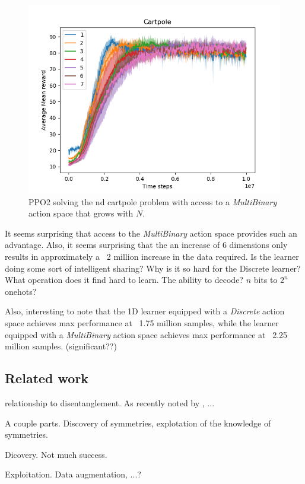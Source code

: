 \begin{figure}
\centering
\includegraphics[width=1\textwidth,height=0.5\textheight]{../../pictures/figures/multibinary-nd-cart.png}
\caption{PPO2 solving the nd cartpole problem with access to a \textit{MultiBinary} action space that grows with $N$.}
\end{figure}

It seems surprising that access to the \textit{MultiBinary} action space provides such an advantage.
Also, it seems surprising that the an increase of 6 dimensions only results in approximately a ~2 million increase in the data required.
Is the learner doing some sort of intelligent sharing?
Why is it so hard for the Discrete learner? What operation does it find hard to learn. The ability to decode? $n$ bits to $2^n$ onehots?

Also, interesting to note that the 1D learner equipped with a \textit{Discrete}
action space achieves max performance at ~1.75 million samples, while the learner
equipped with a \textit{MultiBinary} action space achieves max performance at ~2.25 million samples. (significant??)


\subsection{Related work}

relationship to disentanglement.
As recently noted by \cite{Caselles-Dupre2019}, ...

A couple parts. Discovery of symmetries, explotation of the knowledge of symmetries.

Dicovery. Not much success.

Exploitation. Data augmentation, ...?
